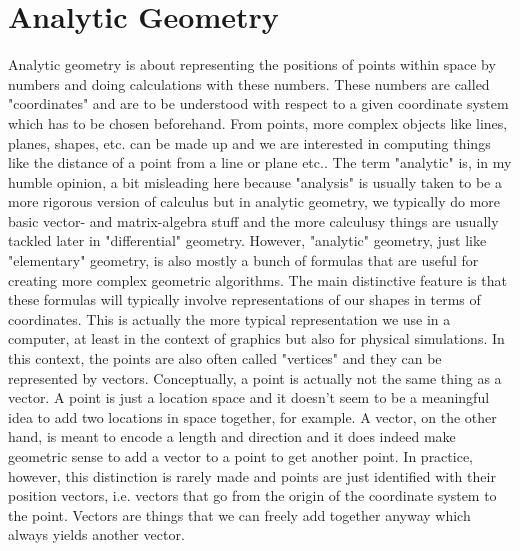 \section{Analytic Geometry}
Analytic geometry is about representing the positions of points within space by numbers and doing calculations with these numbers. These numbers are called "coordinates" and are to be understood with respect to a given coordinate system which has to be chosen beforehand. From points, more complex objects like lines, planes, shapes, etc. can be made up and we are interested in computing things like the distance of a point from a line or plane etc.. The term "analytic" is, in my humble opinion, a bit misleading here because "analysis" is usually taken to be a more rigorous version of calculus but in analytic geometry, we typically do more basic vector- and matrix-algebra stuff and the more calculusy things are usually tackled later in "differential" geometry. However, "analytic" geometry, just like "elementary" geometry, is also mostly a bunch of formulas that are useful for creating more complex geometric algorithms. The main distinctive feature is that these formulas will typically involve representations of our shapes in terms of coordinates. This is actually the more typical representation we use in a computer, at least in the context of graphics but also for physical simulations. In this context, the points are also often called "vertices" and they can be represented by vectors. Conceptually, a point is actually not the same thing as a vector. A point is just a location space and it doesn't seem to be a meaningful idea to add two locations in space together, for example. A vector, on the other hand, is meant to encode a length and direction and it does indeed make geometric sense to add a vector to a point to get another point. In practice, however, this distinction is rarely made and points are just identified with their position vectors, i.e. vectors that go from the origin of the coordinate system to the point. Vectors are things that we can freely add together anyway which always yields another vector.